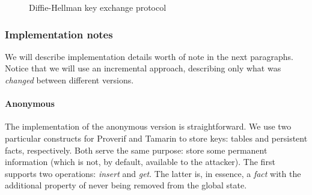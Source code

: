 \begin{figure}[t]
    \setmscoptions
    \begin{msc}{}
    
    

    \nextlevel[5]
    \nextlevel


    \nextlevel[6]
    \nextlevel

    \nextlevel

    \end{msc}
    \centering
    \caption{Diffie-Hellman key exchange protocol}
    \label{fig:dh-key-exchange}
\end{figure}

\subsubsection{Implementation notes}

We will describe implementation details worth of note in the next paragraphs. Notice that we will use an incremental approach, describing only what was \textit{changed} between different versions. 

\paragraph{Anonymous} The implementation of the anonymous version is straightforward. We use two particular constructs for Proverif and Tamarin to store keys: tables and persistent facts, respectively. Both serve the same purpose: store some permanent information (which is not, by default, available to the attacker). The first supports two operations: \textit{insert} and \textit{get}. The latter is, in essence, a \textit{fact} with the additional property of never being removed from the global state.

